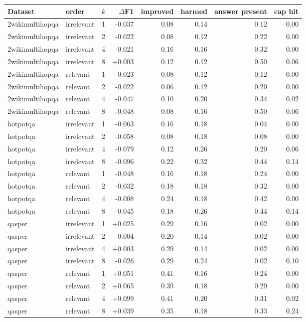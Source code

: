 \begin{tabular}{llrrrrrr}
\toprule
Dataset & order & $k$ & $\Delta$F1 & improved & harmed & answer present & cap hit \\
\midrule
2wikimultihopqa & irrelevant & 1 & -0.037 & 0.08 & 0.14 & 0.12 & 0.00 \\
2wikimultihopqa & irrelevant & 2 & -0.022 & 0.08 & 0.12 & 0.22 & 0.00 \\
2wikimultihopqa & irrelevant & 4 & -0.021 & 0.16 & 0.16 & 0.32 & 0.00 \\
2wikimultihopqa & irrelevant & 8 & +0.003 & 0.12 & 0.12 & 0.50 & 0.06 \\
2wikimultihopqa & relevant & 1 & -0.023 & 0.08 & 0.12 & 0.12 & 0.00 \\
2wikimultihopqa & relevant & 2 & -0.022 & 0.06 & 0.12 & 0.20 & 0.00 \\
2wikimultihopqa & relevant & 4 & -0.047 & 0.10 & 0.20 & 0.34 & 0.02 \\
2wikimultihopqa & relevant & 8 & -0.048 & 0.08 & 0.16 & 0.50 & 0.06 \\
hotpotqa & irrelevant & 1 & -0.063 & 0.16 & 0.18 & 0.04 & 0.00 \\
hotpotqa & irrelevant & 2 & -0.058 & 0.08 & 0.18 & 0.08 & 0.00 \\
hotpotqa & irrelevant & 4 & -0.079 & 0.12 & 0.26 & 0.20 & 0.06 \\
hotpotqa & irrelevant & 8 & -0.096 & 0.22 & 0.32 & 0.44 & 0.14 \\
hotpotqa & relevant & 1 & -0.048 & 0.16 & 0.18 & 0.24 & 0.00 \\
hotpotqa & relevant & 2 & -0.032 & 0.18 & 0.18 & 0.32 & 0.00 \\
hotpotqa & relevant & 4 & -0.008 & 0.24 & 0.18 & 0.42 & 0.00 \\
hotpotqa & relevant & 8 & -0.045 & 0.18 & 0.26 & 0.44 & 0.14 \\
qasper & irrelevant & 1 & +0.025 & 0.29 & 0.16 & 0.02 & 0.00 \\
qasper & irrelevant & 2 & -0.004 & 0.20 & 0.14 & 0.02 & 0.00 \\
qasper & irrelevant & 4 & +0.003 & 0.29 & 0.14 & 0.02 & 0.00 \\
qasper & irrelevant & 8 & -0.026 & 0.29 & 0.24 & 0.02 & 0.10 \\
qasper & relevant & 1 & +0.051 & 0.41 & 0.16 & 0.24 & 0.00 \\
qasper & relevant & 2 & +0.065 & 0.39 & 0.18 & 0.29 & 0.00 \\
qasper & relevant & 4 & +0.099 & 0.41 & 0.20 & 0.31 & 0.02 \\
qasper & relevant & 8 & +0.039 & 0.35 & 0.18 & 0.33 & 0.24 \\
\bottomrule
\end{tabular}
